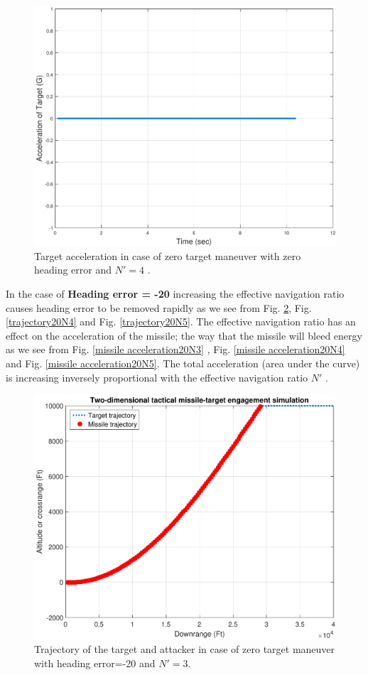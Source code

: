 \begin{figure}[H]
	\centering
	\includegraphics[scale = 0.58]{fig/TargetAccelerationXNT0HE0N4.pdf}
	\caption{Target acceleration in case of zero target maneuver with zero heading error and $N'=4$ .}
	\label{Target accelerationXNT0HE0N4}
\end{figure}


In the case of \textbf{Heading error = -20} increasing the effective navigation ratio causes heading error to be removed rapidly as we see from  Fig. \ref{trajectory20N3}, Fig. \ref{trajectory20N4} and Fig. \ref{trajectory20N5}. The effective navigation ratio has an effect on the acceleration of the missile; the way that the missile will bleed energy as we see from Fig. \ref{missile acceleration20N3} , Fig. \ref{missile acceleration20N4} and Fig. \ref{missile acceleration20N5}. The total acceleration (area under the curve) is increasing inversely proportional with the effective navigation ratio $N'$ .


\begin{figure}[H]
	\centering
	\includegraphics[scale = 0.48]{fig/trajectoryXNT0HE20N3.pdf}
	\caption{Trajectory of the target and attacker in case of zero target maneuver with heading error=-20 and $N'=3$.}
	\label{trajectory20N3}
\end{figure}

